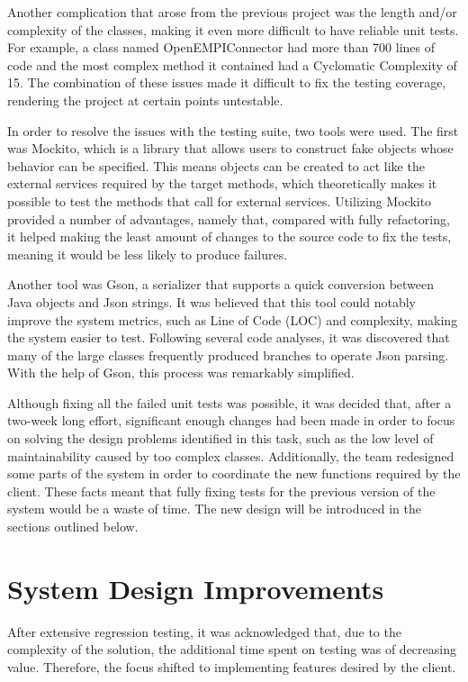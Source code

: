 \documentclass[sigconf]{acmart}
\begin{document}
Another complication that arose from the previous project was the length and/or complexity of the classes, making it even more difficult to have reliable unit tests. For example, a class named OpenEMPIConnector had more than 700 lines of code and the most complex method it contained had a Cyclomatic Complexity of 15. The combination of these issues made it difficult to fix the testing coverage, rendering the project at certain points untestable.

In order to resolve the issues with the testing suite, two tools were used. The first was Mockito, which is a library that allows users to construct fake objects whose behavior can be specified. This means objects can be created to act like the external services required by the target methods, which theoretically makes it possible to test the methods that call for external services. Utilizing Mockito provided a number of advantages, namely that, compared with fully refactoring, it helped making the least amount of changes to the source code to fix the tests, meaning it would be less likely to produce failures.

Another tool was Gson, a serializer that supports a quick conversion between Java objects and Json strings. It was believed that this tool could notably improve the system metrics, such as Line of Code (LOC) and complexity, making the system easier to test. Following several code analyses, it was discovered that many of the large classes frequently produced branches to operate Json parsing. With the help of Gson, this process was remarkably simplified.

Although fixing all the failed unit tests was possible, it was decided that, after a two-week long effort, significant enough changes had been made in order to focus on solving the design problems identified in this task, such as the low level of maintainability caused by too complex classes. Additionally, the team redesigned some parts of the system in order to coordinate the new functions required by the client. These facts meant that fully fixing tests for the previous version of the system would be a waste of time. The new design will be introduced in the sections outlined below.


\section{System Design Improvements} 
After extensive regression testing, it was acknowledged that, due to the complexity of the solution, the additional time spent on testing was of decreasing value. Therefore, the focus shifted to implementing features desired by the client.
\end{document}
